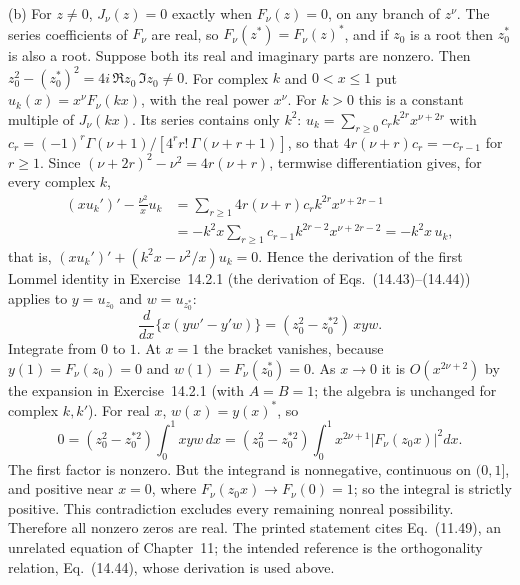 (b) For $z\ne0$, $J_\nu(z)=0$ exactly when $F_\nu(z)=0$, on any
branch of $z^\nu$. The series coefficients of $F_\nu$ are real, so
$F_\nu(z^*)=F_\nu(z)^*$, and if $z_0$ is a root then $z_0^*$ is also
a root. Suppose both its real and imaginary parts are nonzero. Then
$z_0^2-(z_0^*)^2=4i\,\Re z_0\,\Im z_0\ne0$.
For complex $k$ and $0<x\le1$ put $u_k(x)=x^\nu F_\nu(kx)$, with the
real power $x^\nu$. For $k>0$ this is a constant multiple of
$J_\nu(kx)$. Its series contains only $k^2$:
$u_k=\sum_{r\ge0}c_rk^{2r}x^{\nu+2r}$ with
$c_r=(-1)^r\Gamma(\nu+1)/[4^rr!\,\Gamma(\nu+r+1)]$, so that
$4r(\nu+r)c_r=-c_{r-1}$ for $r\ge1$. Since
$(\nu+2r)^2-\nu^2=4r(\nu+r)$, termwise differentiation gives, for
every complex $k$,
\begin{align*}
(xu_k')'-\frac{\nu^2}{x}u_k
&=\sum_{r\ge1}4r(\nu+r)c_rk^{2r}x^{\nu+2r-1}\\
&=-k^2x\sum_{r\ge1}c_{r-1}k^{2r-2}x^{\nu+2r-2}=-k^2x\,u_k,
\end{align*}
that is, $(xu_k')'+(k^2x-\nu^2/x)u_k=0$. Hence the derivation of the first
Lommel identity in Exercise~14.2.1 (the derivation of
Eqs.~(14.43)--(14.44)) applies to $y=u_{z_0}$ and $w=u_{z_0^*}$:
\[
\frac d{dx}\{x(yw'-y'w)\}=(z_0^2-z_0^{*2})\,xyw.
\]
Integrate from $0$ to $1$. At $x=1$ the bracket vanishes, because
$y(1)=F_\nu(z_0)=0$ and $w(1)=F_\nu(z_0^*)=0$. As $x\to0$ it is
$O(x^{2\nu+2})$ by the expansion in Exercise~14.2.1 (with $A=B=1$;
the algebra is unchanged for complex $k,k'$). For real $x$,
$w(x)=y(x)^*$, so
\[
0=(z_0^2-z_0^{*2})\int_0^1xyw\,dx
=(z_0^2-z_0^{*2})\int_0^1x^{2\nu+1}|F_\nu(z_0x)|^2dx.
\]
The first factor is nonzero. But the integrand is nonnegative,
continuous on $(0,1]$, and positive near $x=0$, where
$F_\nu(z_0x)\to F_\nu(0)=1$; so the integral is strictly positive.
This contradiction excludes every remaining nonreal possibility.
Therefore all nonzero zeros are real.
The printed statement cites Eq.~(11.49), an unrelated equation of
Chapter~11; the intended reference is the orthogonality relation,
Eq.~(14.44), whose derivation is used above.

